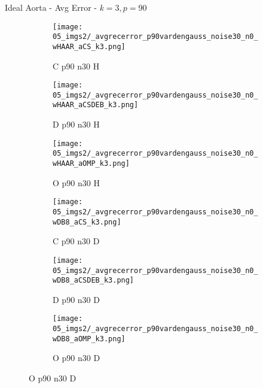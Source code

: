 \begin{frame}{Ideal Aorta - Avg Error - $k=3,p=90$}{}
\begin{figure}
\begin{subfigure}{0.13\textwidth}
\texttt{[image: 05\_imgs2/\_avgrecerror\_p90vardengauss\_noise30\_n0\_wHAAR\_aCS\_k3.png]}
\caption*{\tiny C p90 n30 H}
\end{subfigure}
\begin{subfigure}{0.13\textwidth}
\texttt{[image: 05\_imgs2/\_avgrecerror\_p90vardengauss\_noise30\_n0\_wHAAR\_aCSDEB\_k3.png]}
\caption*{\tiny D p90 n30 H}
\end{subfigure}
\begin{subfigure}{0.13\textwidth}
\texttt{[image: 05\_imgs2/\_avgrecerror\_p90vardengauss\_noise30\_n0\_wHAAR\_aOMP\_k3.png]}
\caption*{\tiny O p90 n30 H}
\end{subfigure}
\begin{subfigure}{0.13\textwidth}
\texttt{[image: 05\_imgs2/\_avgrecerror\_p90vardengauss\_noise30\_n0\_wDB8\_aCS\_k3.png]}
\caption*{\tiny C p90 n30 D}
\end{subfigure}
\begin{subfigure}{0.13\textwidth}
\texttt{[image: 05\_imgs2/\_avgrecerror\_p90vardengauss\_noise30\_n0\_wDB8\_aCSDEB\_k3.png]}
\caption*{\tiny D p90 n30 D}
\end{subfigure}
\begin{subfigure}{0.13\textwidth}
\texttt{[image: 05\_imgs2/\_avgrecerror\_p90vardengauss\_noise30\_n0\_wDB8\_aOMP\_k3.png]}
\caption*{\tiny O p90 n30 D}
\end{subfigure}
\end{figure}
\end{frame}


